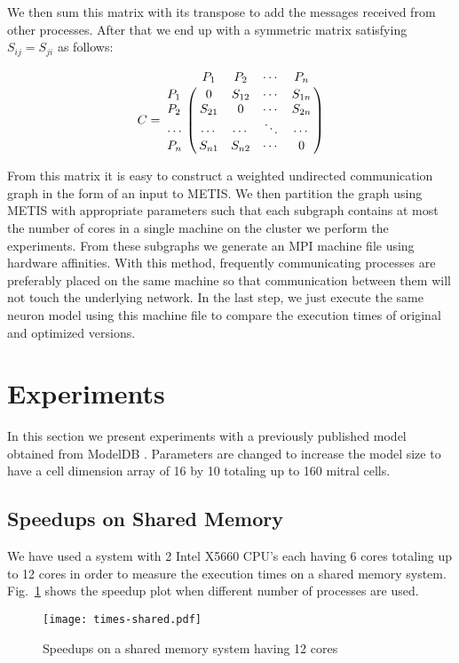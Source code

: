 \documentclass{article}
\begin{document}
We then sum this matrix with its transpose to add the messages received from other processes.
After that we end up with a symmetric matrix satisfying $S_{ij} = S_{ji}$ as follows:

\begin{equation*}
C = \bordermatrix{~      & P_1    & P_2    & \cdots & P_n    \cr
                  P_1    & 0      & S_{12} & \cdots & S_{1n} \cr
                  P_2    & S_{21} & 0      & \cdots & S_{2n} \cr
                  \cdots & \cdots & \cdots & \ddots & \cdots \cr
                  P_n    & S_{n1} & S_{n2} & \cdots & 0      \cr
}
\end{equation*}

From this matrix it is easy to construct a weighted undirected communication graph in the form of an input to METIS.
We then partition the graph using METIS with appropriate parameters such that each subgraph contains at most the number of cores in a single machine on the cluster we perform the experiments.
From these subgraphs we generate an MPI machine file using hardware affinities.
With this method, frequently communicating processes are preferably placed on the same machine so that communication between them will not touch the underlying network.
In the last step, we just execute the same neuron model using this machine file to compare the execution times of original and optimized versions.

\section{Experiments}
\label{sec:experiments}

In this section we present experiments with a previously published model \cite{davison_dendrodendritic_2003} obtained from ModelDB \cite{hines_modeldb:_2004}.
Parameters are changed to increase the model size to have a cell dimension array of 16 by 10 totaling up to 160 mitral cells.

\subsection{Speedups on Shared Memory}

We have used a system with 2 Intel X5660 CPU's each having 6 cores totaling up to 12 cores in order to measure the execution times on a shared memory system.
Fig.~\ref{fig:times-shared} shows the speedup plot when different number of processes are used.

\begin{figure}
  \centering
  \texttt{[image: times-shared.pdf]}
  \caption{Speedups on a shared memory system having 12 cores}
  \label{fig:times-shared}
\end{figure}
\end{document}
